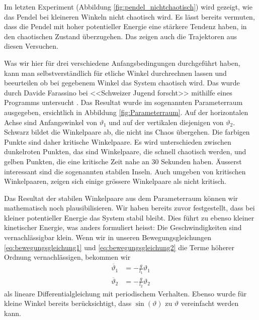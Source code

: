 Im letzten Experiment (Abbildung \ref{fig:pendel_nichtchaotisch}) wird gezeigt,
wie das Pendel bei kleineren Winkeln nicht chaotisch wird.
Es lässt bereits vermuten, dass die Pendel mit hoher potentieller Energie eine stärkere Tendenz haben,
in den chaotischen Zustand überzugehen.
Das zeigen auch die Trajektoren aus diesen Versuchen.

Was wir hier für drei verschiedene Anfangsbedingungen durchgeführt haben, kann man selbstverständlich
für etliche Winkel durchrechnen lassen und beeurteilen ob bei gegebenem Winkel das System chaotisch wird.
%
Das wurde durch Davide Farassino bei <<Schweizer Jugend forscht>> 
mithilfe eines Programms untersucht \cite{doppelpendel:wettbewerbsarbeit}.
Das Resultat wurde im sogenannten Parameterraum ausgegeben,
ersichtlich in Abbildung \ref{fig:Parameterraum}.
Auf der horizontalen Achse sind Anfangswinkel von \(\vartheta_1\) und
auf der vertikalen diejenigen von \(\vartheta_2\).
Schwarz bildet die Winkelpaare ab, die nicht ins Chaos übergehen.
Die farbigen Punkte sind daher kritische Winkelpaare.
Es wird unterschieden zwischen dunkelroten Punkten,
das sind Winkelpaare, die schnell chaotisch werden, und
gelben Punkten, die eine kritische Zeit nahe an 30 Sekunden haben.
Äusserst interessant sind die sogenannten stabilen Inseln.
Auch umgeben von kritischen Winkelpaaren, zeigen sich einige
grössere Winkelpaare als nicht kritisch.

Das Resultat der stabilen Winkelpaare aus dem Parameterraum können wir mathematisch noch plausibilisieren.
Wir haben bereits zuvor festgestellt, dass bei kleiner potentieller Energie das System stabil bleibt.
Dies führt zu ebenso kleiner kinetischer Energie, was anders formuliert heisst:
Die Geschwindigkeiten sind vernachlässigbar klein.
Wenn wir in unseren Bewegungsgleichungen
\eqref{eq:bewegungsgleichung1} und \eqref{eq:bewegungsgleichung2}
die Terme höherer Ordnung vernachlässigen, bekommen wir
\begin{align*}
\ddot{\vartheta_1} &= -\frac{g}{l_1} \vartheta_1\\
\ddot{\vartheta_2} &= -\frac{g}{l_2} \vartheta_2
\end{align*}
als lineare Differentialgleichung mit periodischem Verhalten.
Ebenso wurde für kleine Winkel bereits berücksichtigt,
dass \(\sin(\vartheta)\) zu \(\vartheta\) vereinfacht werden kann.

